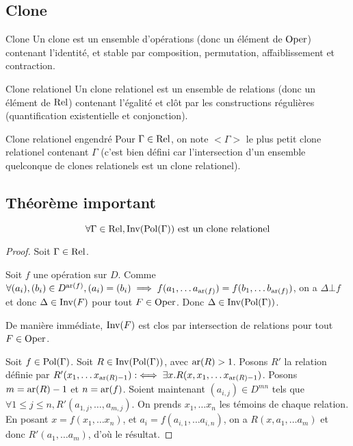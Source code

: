 \subsection{Clone}

\begin{defi}{Clone} Un clone est un ensemble d'opérations (donc un élément de $\text{Oper}$)
    contenant l'identité, et stable par composition, permutation, affaiblissement et
    contraction.
\end{defi}

\begin{defi}{Clone relationel} Un clone relationel est un ensemble de relations
    (donc un élément de $\text{Rel}$) contenant l'égalité et clôt par les constructions
    régulières (quantification existentielle et conjonction).
\end{defi}

\begin{defi}{Clone relationel engendré} Pour $\Gamma\in\text{Rel}$, on note $<\Gamma>$ le plus
    petit clone relationel contenant $\Gamma$ (c'est bien défini car l'intersection d'un
    ensemble quelconque de clones relationels est un clone relationel).
\end{defi}

\subsection{Théorème important}

\begin{lem}{}
    \[\forall \Gamma\in\text{Rel}, \text{Inv}(\text{Pol}(\Gamma)) \text{ est un clone relationel}\]
\end{lem}
\begin{proof}
    Soit $\Gamma\in\text{Rel}$.

    Soit $f$ une opération sur $D$. Comme
    $\forall (a_i), (b_i)\in D^{\text{ar}(f)}, (a_i) = (b_i) 
        \implies f(a_1, \dots a_{\text{ar}(f)}) = f(b_1, \dots b_{\text{ar}(f)})$, on a $\Delta\bot f$
    et donc $\Delta\in \text{Inv}(F)$ pour tout $F\in\text{Oper}$. Donc $\Delta\in\text{Inv}(\text{Pol}(\Gamma))$.

    De manière immédiate, $\text{Inv}(F)$ est clos par intersection de relations pour tout
    $F\in\text{Oper}$.

    Soit $f\in\text{Pol}(\Gamma)$. Soit $R\in\text{Inv}(\text{Pol}(\Gamma))$, avec $\text{ar}(R)>1$. Posons
    $R'$ la relation définie par $R'(x_1, \dots x_{\text{ar}(R)-1}) :\iff
    \exists x. R(x, x_1, \dots x_{\text{ar}(R)-1})$. Posons $m = \text{ar}(R) - 1$ et $n = \text{ar}(f)$.
    Soient maintenant $(a_{i,j})\in D^{mn}$ tels que
    $\forall 1\leq j\leq n, R'(a_{1,j}, \dots, a_{m,j})$. On prends $x_1, \dots x_n$ les
    témoins de chaque relation. En posant $x = f(x_1, \dots x_n)$, et
    $a_i = f(a_{i,1}, \dots a_{i,n})$, on a $R(x, a_1, \dots a_m)$ et donc
    $R'(a_1, \dots a_m)$, d'où le résultat.
\end{proof}

